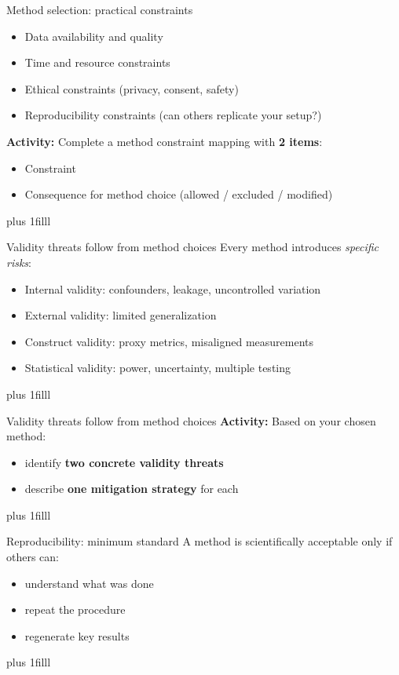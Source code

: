 \documentclass[aspectratio=169]{beamer}
\newcommand{\btVFill}{\vskip0pt plus 1filll}
\newcommand{\Activity}[1]{\textbf{Activity:} #1}
\begin{document}
\begin{frame}{Method selection: practical constraints}
  \begin{itemize}
    \item Data availability and quality
    \item Time and resource constraints
    \item Ethical constraints (privacy, consent, safety)
    \item Reproducibility constraints (can others replicate your setup?)
  \end{itemize}
  \bigskip
  \Activity{
  Complete a method constraint mapping with \textbf{2 items}:
  \begin{itemize}
    \item Constraint
    \item Consequence for method choice (allowed / excluded / modified)
  \end{itemize}
  }
\btVFill
\end{frame}

\begin{frame}{Validity threats follow from method choices}
  Every method introduces \emph{specific risks}:
  \begin{itemize}
    \item Internal validity: confounders, leakage, uncontrolled variation
    \item External validity: limited generalization
    \item Construct validity: proxy metrics, misaligned measurements
    \item Statistical validity: power, uncertainty, multiple testing
  \end{itemize}
\btVFill
\end{frame}

\begin{frame}{Validity threats follow from method choices}
  \Activity{
  Based on your chosen method:
  \begin{itemize}
    \item identify \textbf{two concrete validity threats}
    \item describe \textbf{one mitigation strategy} for each
  \end{itemize}
  }
  \btVFill
\end{frame}

\begin{frame}{Reproducibility: minimum standard}
  A method is scientifically acceptable only if others can:
  \begin{itemize}
    \item understand what was done
    \item repeat the procedure
    \item regenerate key results
  \end{itemize}
\btVFill
\end{frame}
\end{document}
